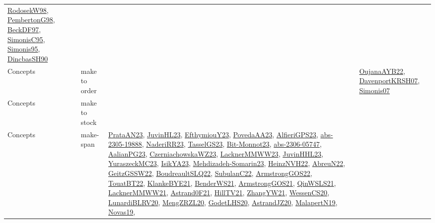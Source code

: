 {\begin{longtable}{lp{3cm}>{\raggedright}p{6cm}>{\raggedright}p{6cm}p{8cm}}
\href{papers/RodosekW98.pdf}{RodosekW98}\cite{RodosekW98}, \href{papers/PembertonG98.pdf}{PembertonG98}\cite{PembertonG98}, \href{papers/BeckDF97.pdf}{BeckDF97}\cite{BeckDF97}, \href{papers/SimonisC95.pdf}{SimonisC95}\cite{SimonisC95}, \href{papers/Simonis95.pdf}{Simonis95}\cite{Simonis95}, \href{articles/DincbasSH90.pdf}{DincbasSH90}\cite{DincbasSH90}\\
Concepts & make to order &  &  & \href{papers/OujanaAYB22.pdf}{OujanaAYB22}\cite{OujanaAYB22}, \href{papers/DavenportKRSH07.pdf}{DavenportKRSH07}\cite{DavenportKRSH07}, \href{articles/Simonis07.pdf}{Simonis07}\cite{Simonis07}\\
Concepts & make to stock &  &  & \\
Concepts & make-span & \href{articles/PrataAN23.pdf}{PrataAN23}\cite{PrataAN23}, \href{papers/JuvinHL23.pdf}{JuvinHL23}\cite{JuvinHL23}, \href{papers/EfthymiouY23.pdf}{EfthymiouY23}\cite{EfthymiouY23}, \href{papers/PovedaAA23.pdf}{PovedaAA23}\cite{PovedaAA23}, \href{articles/AlfieriGPS23.pdf}{AlfieriGPS23}\cite{AlfieriGPS23}, \href{articles/abs-2305-19888.pdf}{abs-2305-19888}\cite{abs-2305-19888}, \href{articles/NaderiRR23.pdf}{NaderiRR23}\cite{NaderiRR23}, \href{papers/TasselGS23.pdf}{TasselGS23}\cite{TasselGS23}, \href{papers/Bit-Monnot23.pdf}{Bit-Monnot23}\cite{Bit-Monnot23}, \href{articles/abs-2306-05747.pdf}{abs-2306-05747}\cite{abs-2306-05747}, \href{papers/AalianPG23.pdf}{AalianPG23}\cite{AalianPG23}, \href{articles/CzerniachowskaWZ23.pdf}{CzerniachowskaWZ23}\cite{CzerniachowskaWZ23}, \href{articles/LacknerMMWW23.pdf}{LacknerMMWW23}\cite{LacknerMMWW23}, \href{papers/JuvinHHL23.pdf}{JuvinHHL23}\cite{JuvinHHL23}, \href{papers/YuraszeckMC23.pdf}{YuraszeckMC23}\cite{YuraszeckMC23}, \href{articles/IsikYA23.pdf}{IsikYA23}\cite{IsikYA23}, \href{papers/Mehdizadeh-Somarin23.pdf}{Mehdizadeh-Somarin23}\cite{Mehdizadeh-Somarin23}, \href{articles/HeinzNVH22.pdf}{HeinzNVH22}\cite{HeinzNVH22}, \href{articles/AbreuN22.pdf}{AbreuN22}\cite{AbreuN22}, \href{papers/GeitzGSSW22.pdf}{GeitzGSSW22}\cite{GeitzGSSW22}, \href{papers/BoudreaultSLQ22.pdf}{BoudreaultSLQ22}\cite{BoudreaultSLQ22}, \href{articles/SubulanC22.pdf}{SubulanC22}\cite{SubulanC22}, \href{papers/ArmstrongGOS22.pdf}{ArmstrongGOS22}\cite{ArmstrongGOS22}, \href{papers/TouatBT22.pdf}{TouatBT22}\cite{TouatBT22}, \href{papers/KlankeBYE21.pdf}{KlankeBYE21}\cite{KlankeBYE21}, \href{papers/BenderWS21.pdf}{BenderWS21}\cite{BenderWS21}, \href{papers/ArmstrongGOS21.pdf}{ArmstrongGOS21}\cite{ArmstrongGOS21}, \href{articles/QinWSLS21.pdf}{QinWSLS21}\cite{QinWSLS21}, \href{papers/LacknerMMWW21.pdf}{LacknerMMWW21}\cite{LacknerMMWW21}, \href{papers/Astrand0F21.pdf}{Astrand0F21}\cite{Astrand0F21}, \href{papers/HillTV21.pdf}{HillTV21}\cite{HillTV21}, \href{articles/ZhangYW21.pdf}{ZhangYW21}\cite{ZhangYW21}, \href{papers/WessenCS20.pdf}{WessenCS20}\cite{WessenCS20}, \href{articles/LunardiBLRV20.pdf}{LunardiBLRV20}\cite{LunardiBLRV20}, \href{articles/MengZRZL20.pdf}{MengZRZL20}\cite{MengZRZL20}, \href{papers/GodetLHS20.pdf}{GodetLHS20}\cite{GodetLHS20}, \href{articles/AstrandJZ20.pdf}{AstrandJZ20}\cite{AstrandJZ20}, \href{papers/MalapertN19.pdf}{MalapertN19}\cite{MalapertN19}, \href{articles/Novas19.pdf}{Novas19}\cite{Novas19}, 
\end{longtable}}
